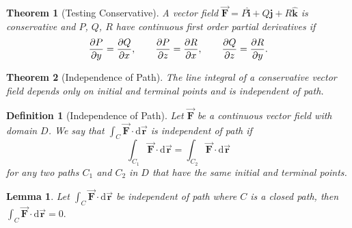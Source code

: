 \documentclass[12pt,a4paper]{article}
\newtheorem{thm}{Theorem}[subsection]
\newtheorem{df}{Definition}[subsection]
\newtheorem{lem}{Lemma}[section]
\def\dsst{\displaystyle}
\def\d{{\mathrm{d}}}
\def\intC{\dsst\int_C}
\def\vecr{\vec{\boldsymbol{\textbf{r}}}}
\def\veci{\hat{\boldsymbol{\textbf{i}}}}
\def\vecj{\hat{\boldsymbol{\textbf{j}}}}
\def\veck{\hat{\boldsymbol{\textbf{k}}}}
\def\F{\vec{\boldsymbol{\textbf{F}}}}
\begin{document}
\begin{thm}[Testing Conservative]
	A vector field $\F=P\veci+Q\vecj+R\veck$ is conservative and $P$, $Q$, $R$ have continuous first order partial derivatives if \[\pdv{P}{y}=\pdv{Q}{x},\qquad\pdv{P}{z}=\pdv{R}{x},\qquad\pdv{Q}{z}=\pdv{R}{y}.\]	
\end{thm}
\begin{thm}[Independence of Path]
	The line integral of a conservative vector field depends only on initial and terminal points and is independent of path.	
\end{thm}
\begin{df}[Independence of Path]
	Let $\F$ be a continuous vector field with domain $D$. We say that $\intC\F\cdot\d\vecr$ is independent of path if \[\int_{C_1}\F\cdot\d\vecr=\int_{C_2}\F\cdot\d\vecr\] for any two paths $C_1$ and $C_2$ in $D$ that have the same initial and terminal points. 	
\end{df}
\begin{lem}\label{lem5.1}
	Let $\intC\F\cdot\d\vecr$ be independent of path where $C$ is a closed path, then $\intC\F\cdot\d\vecr=0.$
\end{lem}
\end{document}

